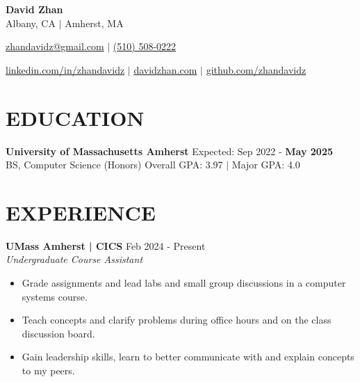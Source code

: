 \documentclass[letterpaper,10pt]{extarticle}
\begin{document}
\pagestyle{empty}

\begin{center}
\textbf{\Large David Zhan}\\[2pt] %
Albany, CA $|$ Amherst, MA

\href{mailto:zhandavidz@gmail.com}{zhandavidz@gmail.com} $|$ \href{tel:5105080222}{(510) 508-0222}

\href{https://www.linkedin.com/in/zhandavidz}{linkedin.com/in/zhandavidz} $|$ \href{https://davidzhan.com}{davidzhan.com} $|$ \href{https://github.com/zhandavidz}{github.com/zhandavidz}
\end{center}

\section*{EDUCATION}
\noindent
\textbf{University of Massachusetts Amherst} \hfill Expected: Sep 2022 - \textbf{May 2025}\\ %
BS, Computer Science (Honors) \hfill Overall GPA: 3.97 $|$ Major GPA: 4.0 %

\section*{EXPERIENCE}

\noindent
\textbf{UMass Amherst | CICS} \hfill Feb 2024 - Present \\ %
\textit{Undergraduate Course Assistant} %
\begin{itemize}
    \item Grade assignments and lead labs and small group discussions in a computer systems course.
    \item Teach concepts and clarify problems during office hours and on the class discussion board.
    \item Gain leadership skills, learn to better communicate with and explain concepts to my peers.
\end{itemize}
\end{document}
